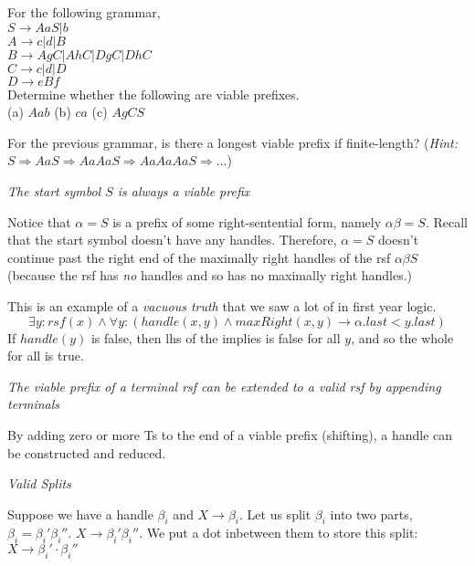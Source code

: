 \frmrule 

\begin{example}
For the following grammar,\\
$S \rightarrow AaS | b$\\
$A \rightarrow c | d | B$\\
$B \rightarrow AgC | AhC | DgC | DhC$\\
$C \rightarrow c | d | D $\\
$D \rightarrow eBf $ \\
Determine whether the following are viable prefixes. \\
(a) $Aab$ (b) $ca$ (c) $AgCS$
\end{example}

\frmrule

\begin{example}
For the previous grammar, is there a longest viable prefix if finite-length?
(\textit{Hint:} $S \Rightarrow AaS \Rightarrow AaAaS \Rightarrow AaAaAaS \Rightarrow ...$)
\end{example}


\frmrule



\textit{The start symbol $S$ is always a viable prefix }

Notice that $\alpha = S$ is a prefix of some right-sentential form, 
namely $\alpha\beta = S$. 
Recall that the start symbol doesn't have any handles. 
Therefore,
$\alpha = S$ doesn't continue past 
the right end of the maximally right handles of the rsf $\alpha\beta S$ 
(because the rsf has \textit{no} handles and so has no maximally right handles.)

This is an example of a \textit{vacuous truth} that we saw a lot of in first 
year logic.
$$\exists y: rsf(x) \wedge \forall y: (handle(x,y) \wedge maxRight(x,y) \rightarrow \alpha.last < y.last)$$
If $handle(y)$ is false, then lhs of the implies is false for all $y$, 
and so the whole for all is true. 

\frmrule 


\textit{The viable prefix of a terminal rsf can be extended to a valid rsf by appending terminals }

By adding zero or more Ts to the end of a viable prefix (shifting), a handle 
can be constructed and reduced.

\frmrule 

\textit{Valid Splits}

Suppose we have a handle $\beta_i$ and $X \rightarrow \beta_i$. 
Let us split $\beta_i$ into two parts, $\beta_i = \beta_{i}' \beta_{i}''$. 
$X \rightarrow \beta_{i}' \beta_{i}''$. We put a dot inbetween them 
to store this split: $X \rightarrow \beta_{i}' \cdot \beta_{i}''$

